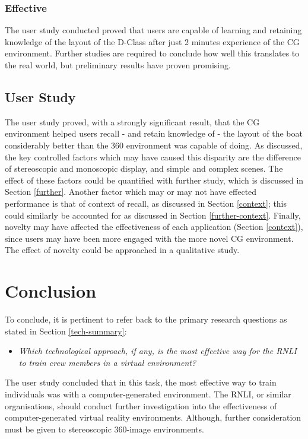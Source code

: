 \documentclass[ %
                    author={Elis Jones},
                supervisor={Dr. Kirsten Cater},
                    degree={BSc},
                     title={The Effect of Presentation Medium on Spatial Cognition},
                  subtitle={in the Virtual Environment},
                      year={2018} ]{dissertation}
\begin{document}
\subsubsection{Effective}
The user study conducted proved that users are capable of learning and retaining knowledge of the layout of the D-Class after just 2 minutes experience of the CG environment. Further studies are required to conclude how well this translates to the real world, but preliminary results have proven promising. 

\subsection{User Study}
The user study proved, with a strongly significant result, that the CG environment helped users recall - and retain knowledge of - the layout of the boat considerably better than the 360 environment was capable of doing. As discussed, the key controlled factors which may have caused this disparity are the difference of stereoscopic and monoscopic display, and simple and complex scenes. The effect of these factors could be quantified with further study, which is discussed in Section \ref{further}. Another factor which may or may not have effected performance is that of context of recall, as discussed in Section \ref{context}; this could similarly be accounted for as discussed in Section \ref{further-context}. Finally, novelty may have affected the effectiveness of each application (Section \ref{context}), since users may have been more engaged with the more novel CG environment. The effect of novelty could be approached in a qualitative study. 

\section{Conclusion}
To conclude, it is pertinent to refer back to the primary research questions as stated in Section \ref{tech-summary}:

\begin{itemize}
    \item \textit{Which technological approach, if any, is the most effective way for the RNLI to train crew members in a virtual environment?}
\end{itemize}

The user study concluded that in this task, the most effective way to train individuals was with a computer-generated environment. The RNLI, or similar organisations, should conduct further investigation into the effectiveness of computer-generated virtual reality environments. Although, further consideration must be given to stereoscopic 360-image environments.
\end{document}

